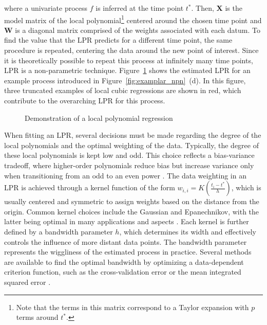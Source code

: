 \documentclass[man, floatsintext]{apa7}
\begin{document}
\noindent where a univariate process $f$ is inferred at the time point $t^*$.
Then, \textbf{X} is the model matrix of the local polynomial\footnote{Note
  that the terms in this matrix correspond to a Taylor expansion with $p$ terms
  around $t^*$.} centered around the chosen time point and \textbf{W} is a
diagonal matrix comprised of the weights associated with each datum. To find
the value that the LPR predicts for a different time point, the same procedure
is repeated, centering the data around the new point of interest. Since it is
theoretically possible to repeat this process at infinitely many time points,
LPR is a non-parametric technique. Figure~\ref{fig:locpol_dem} shows the
estimated LPR for an example process introduced in
Figure~\ref{fig:examplar_npn}~(d). In this figure, three truncated examples of
local cubic regressions are shown in red, which contribute to the overarching
LPR for this process.\@

\begin{figure}[!ht]
  \caption{Demonstration of a local polynomial regression}
  \label{fig:locpol_dem}
\end{figure}

When fitting an LPR, several decisions must be made regarding the degree of the
local polynomials and the optimal weighting of the data. Typically, the degree
of these local polynomials is kept low and odd. This choice reflects a
bias-variance tradeoff, where higher-order polynomials reduce bias but increase
variance only when transitioning from an odd to an even power
\parencite{ruppert_multivariate_1994}. The data weighting in an LPR is achieved
through a kernel function of the form $w_{i, i} = K(\frac{t_i - t^*}{h})$,
which is usually centered and symmetric to assign weights based on the distance
from the origin. Common kernel choices include the Gaussian and Epanechnikov,
with the latter being optimal in many applications and aspects
\parencite{fan_local_1997}. Each kernel is further defined by a bandwidth
parameter $h$, which determines its width and effectively controls the
influence of more distant data points. The bandwidth parameter represents the
wiggliness of the estimated process in practice. Several methods are available
to find the optimal bandwidth by optimizing a data-dependent criterion
function, such as the cross-validation error or the mean integrated squared
error \parencite{kohler_review_2014, debruyne_model_2008}.
\end{document}
